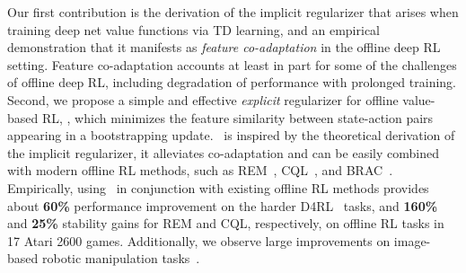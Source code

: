 Our first contribution is the derivation of the implicit regularizer that arises when training deep net value functions via TD learning, and an empirical demonstration that it manifests as \emph{feature co-adaptation} in the offline deep RL setting.
Feature co-adaptation accounts at least in part for some of the challenges of offline deep RL, including degradation of performance with prolonged training. Second, we propose a simple and effective \emph{explicit} regularizer for offline value-based RL, \methodname, which minimizes the feature similarity between state-action pairs appearing in a bootstrapping update. \methodname\ is inspired by the theoretical derivation of the implicit regularizer, it alleviates co-adaptation and can be easily combined with modern offline RL methods, such as REM~\citep{agarwal2019optimistic}, CQL~\citep{kumar2020conservative}, and BRAC~\citep{wu2019behavior}. Empirically, using \methodname\ in conjunction with existing offline RL methods provides about \textbf{60\%} performance improvement on the harder D4RL~\citep{fu2020d4rl} tasks, and \textbf{160\%} and \textbf{25\%} stability gains for REM and CQL, respectively, on offline RL tasks in 17 Atari 2600 games. Additionally, we observe large improvements on image-based robotic manipulation tasks~\citep{singh2020cog}.
